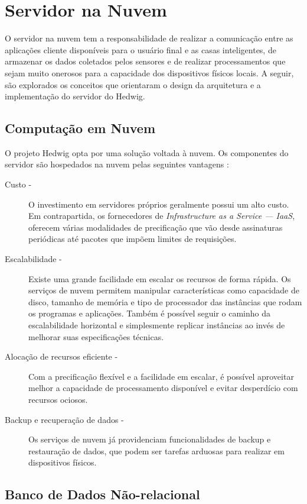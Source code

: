 \section{Servidor na Nuvem}

O servidor na nuvem tem a responsabilidade de realizar a comunicação entre as aplicações cliente disponíveis para o usuário final e as casas inteligentes, de armazenar os dados coletados pelos sensores e de realizar processamentos que sejam muito onerosos para a capacidade dos dispositivos físicos locais. A seguir, são explorados os conceitos que orientaram o design da arquitetura e a implementação do servidor do Hedwig.

\subsection{Computação em Nuvem}

O projeto Hedwig opta por uma solução voltada à nuvem. Os componentes do servidor são hospedados na nuvem pelas seguintes vantagens \cite{viswanathan}:

\begin{description}
\item[Custo -]O investimento em servidores próprios geralmente possui um alto custo. Em contrapartida, os fornecedores de \emph{Infrastructure as a Service --- IaaS}, oferecem várias modalidades de precificação que vão desde assinaturas periódicas até pacotes que impõem limites de requisições.
\item[Escalabilidade -]Existe uma grande facilidade em escalar os recursos de forma rápida. Os serviços de nuvem permitem manipular características como capacidade de disco, tamanho de memória e tipo de processador das instâncias que rodam os programas e aplicações. Também é possível seguir o caminho da escalabilidade horizontal e simplesmente replicar instâncias ao invés de melhorar suas especificações técnicas.
\item[Alocação de recursos eficiente -]Com a precificação flexível e a facilidade em escalar, é possível aproveitar melhor a capacidade de processamento disponível e evitar desperdício com recursos ociosos.
\item[Backup e recuperação de dados -]Os serviços de nuvem já providenciam funcionalidades de backup e restauração de dados, que podem ser tarefas arduosas para realizar em dispositivos físicos.
\end{description}

\subsection{Banco de Dados Não-relacional}

